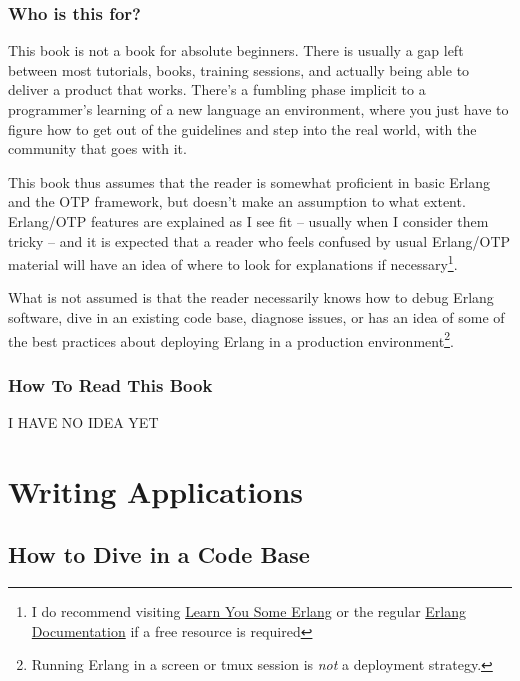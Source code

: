 \documentclass[11pt, oneside]{book}   	%
\begin{document}
\section{Who is this for?}
\label{sec:who-is-this-for}

This book is not a book for absolute beginners. There is usually a gap left between most tutorials, books, training sessions, and actually being able to deliver a product that works. There's a fumbling phase implicit to a programmer's learning of a new language an environment, where you just have to figure how to get out of the guidelines and step into the real world, with the community that goes with it.

This book thus assumes that the reader is somewhat proficient in basic Erlang and the OTP framework, but doesn't make an assumption to what extent. Erlang/OTP features are explained as I see fit -- usually when I consider them tricky -- and it is expected that a reader who feels confused by usual Erlang/OTP material will have an idea of where to look for explanations if necessary\footnote{I do recommend visiting \href{http://learnyousomeerlang.com}{Learn You Some Erlang} or the regular \href{http://www.erlang.org/erldoc}{Erlang Documentation} if a free resource is required}.

What is not assumed is that the reader necessarily knows how to debug Erlang software, dive in an existing code base, diagnose issues, or has an idea of some of the best practices about deploying Erlang in a production environment\footnote{Running Erlang in a screen or tmux session is \emph{not} a deployment strategy.}.

\section{How To Read This Book}
\label{sec:how-to-read-this-book}

I HAVE NO IDEA YET


\part{Writing Applications}
\label{part:writing-applications}

\chapter{How to Dive in a Code Base}
\label{chap:how-to-dive-in-a-code-base}
\end{document}
